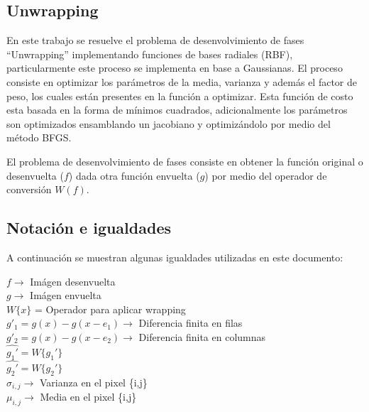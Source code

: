  
\subsection{Unwrapping}

En este trabajo se resuelve el problema de desenvolvimiento de fases ``Unwrapping'' implementando funciones de bases radiales (RBF), particularmente este proceso se implementa en base a Gaussianas.
%
El proceso consiste en optimizar los parámetros de la media, varianza y además el factor de peso, los cuales están presentes en la función a optimizar.
%
Esta función de costo esta basada en la forma de mínimos cuadrados, adicionalmente los parámetros son optimizados ensamblando un jacobiano y optimizándolo por medio del método BFGS.
%

%
El problema de desenvolvimiento de fases consiste en obtener la función original o desenvuelta ($f$) dada otra función envuelta ($g$) por medio del operador de conversión $W(f)$. 



\subsection{Notación e igualdades}
A continuación se muestran algunas igualdades utilizadas en este documento:

$f \rightarrow$ Imágen desenvuelta\\
$g \rightarrow$ Imágen envuelta\\
$W\{x\}$ = Operador para aplicar wrapping\\
$g'_1 = g(x) - g(x - e_1) \rightarrow$ Diferencia finita en filas\\
$g'_2 = g(x) - g(x - e_2) \rightarrow$ Diferencia finita en columnas\\
$\widehat{g_1'} = W\{g_1'\}$\\
$\widehat{g_2'} = W\{g_2'\}$\\
$\sigma_{i,j} \rightarrow$  Varianza en el pixel \{i,j\}\\
$\mu_{i,j} \rightarrow$ Media en el pixel \{i,j\}

